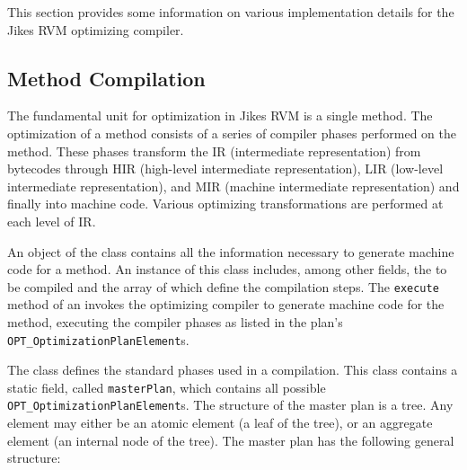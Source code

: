 This section provides some information on various
implementation details for the Jikes\TMweb{} RVM optimizing compiler.

\subsection{Method Compilation}
\label{sec:optdriver}
The fundamental unit for optimization in Jikes RVM is a single method. 
The optimization of a method consists of a series of 
compiler phases performed on the method. These 
phases transform the  
IR (intermediate representation) from bytecodes through 
HIR (high-level intermediate representation), 
LIR (low-level intermediate representation), and 
MIR (machine intermediate representation) and finally into machine code. 
Various optimizing transformations are performed at each level of IR.

An object of the class 
contains all the  
information necessary to generate machine code for a method. 
An instance of this class includes, among other fields, 
the 
to be compiled and the array of 
which define the compilation steps.
The {\tt execute} method of an
invokes the optimizing compiler to generate machine code for the method,
executing the compiler phases as listed in the plan's
{\tt OPT\_OptimizationPlanElement}s.

The 
class defines the standard phases used in a compilation.
This class
contains a static field, called {\tt masterPlan}, which contains all
possible {\tt OPT\_OptimizationPlanElement}s.
The structure of the master plan is 
a tree. Any element may either be an atomic element (a leaf of the 
tree), or an aggregate element (an internal node of the tree).
The master plan has the following general structure:

